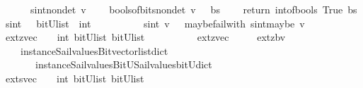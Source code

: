 \begin{isabellebody}
\ \ \ \ \ {\isachardoublequoteopen}\ sint{\isacharunderscore}nondet\ v\ {\isacharequal}\ {\isacharparenleft}\isanewline
\ \ bools{\isacharunderscore}of{\isacharunderscore}bits{\isacharunderscore}nondet\ v\ {\isasymbind}\ {\isacharparenleft}{\isasymlambda}\ bs\ {\isachardot}\ \isanewline
\ \ return\ {\isacharparenleft}int{\isacharunderscore}of{\isacharunderscore}bools\ True\ bs{\isacharparenright}{\isacharparenright}{\isacharparenright}{\isachardoublequoteclose}\isanewline
\isanewline
{}\isamarkupfalse%
\ sint\ \ {\isacharcolon}{\isacharcolon}\ {\isachardoublequoteopen}{\isacharparenleft}bitU{\isacharparenright}list\ {\isasymRightarrow}\ int\ {\isachardoublequoteclose}\ \ \ \isanewline
\ \ \ \ \ {\isachardoublequoteopen}\ sint\ v\ {\isacharequal}\ {\isacharparenleft}\ maybe{\isacharunderscore}failwith\ {\isacharparenleft}sint{\isacharunderscore}maybe\ v{\isacharparenright}{\isacharparenright}{\isachardoublequoteclose}\isanewline
\isanewline
\isanewline
%
\isanewline
{}\isamarkupfalse%
\ extz{\isacharunderscore}vec\ \ {\isacharcolon}{\isacharcolon}\ {\isachardoublequoteopen}\ int\ {\isasymRightarrow}{\isacharparenleft}bitU{\isacharparenright}list\ {\isasymRightarrow}{\isacharparenleft}bitU{\isacharparenright}list\ {\isachardoublequoteclose}\ \ \ \isanewline
\ \ \ \ \ {\isachardoublequoteopen}\ extz{\isacharunderscore}vec\ {\isacharequal}\ {\isacharparenleft}\ \isanewline
\ \ extz{\isacharunderscore}bv\isanewline
\ \ \ \ {\isacharparenleft}instance{\isacharunderscore}Sail{}{\isacharunderscore}values{\isacharunderscore}Bitvector{\isacharunderscore}list{\isacharunderscore}dict\isanewline
\ \ \ \ \ \ \ instance{\isacharunderscore}Sail{}{\isacharunderscore}values{\isacharunderscore}BitU{\isacharunderscore}Sail{}{\isacharunderscore}values{\isacharunderscore}bitU{\isacharunderscore}dict{\isacharparenright}\ {\isacharparenright}{\isachardoublequoteclose}\isanewline
\isanewline
\isanewline
%
\isanewline
{}\isamarkupfalse%
\ exts{\isacharunderscore}vec\ \ {\isacharcolon}{\isacharcolon}\ {\isachardoublequoteopen}\ int\ {\isasymRightarrow}{\isacharparenleft}bitU{\isacharparenright}list\ {\isasymRightarrow}{\isacharparenleft}bitU{\isacharparenright}list\ {\isachardoublequoteclose}\ \ \ \isanewline

\end{isabellebody}
